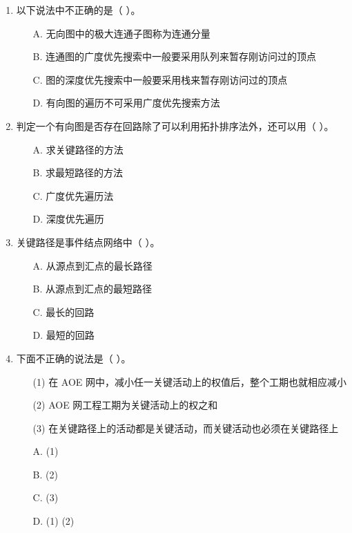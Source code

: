 \documentclass[12pt, a4paper]{article}
\begin{document}
\begin{enumerate}
    \item 以下说法中不正确的是（ ）。
    \begin{enumerate}
        \item[A.] 无向图中的极大连通子图称为连通分量
        \item[B.] 连通图的广度优先搜索中一般要采用队列来暂存刚访问过的顶点
        \item[C.] 图的深度优先搜索中一般要采用栈来暂存刚访问过的顶点
        \item[D.] 有向图的遍历不可采用广度优先搜索方法
    \end{enumerate}
    
    \item 判定一个有向图是否存在回路除了可以利用拓扑排序法外，还可以用（ ）。
    \begin{enumerate}
        \item[A.] 求关键路径的方法
        \item[B.] 求最短路径的方法
        \item[C.] 广度优先遍历法
        \item[D.] 深度优先遍历
    \end{enumerate}
    
    \item 关键路径是事件结点网络中（ ）。
    \begin{enumerate}
        \item[A.] 从源点到汇点的最长路径
        \item[B.] 从源点到汇点的最短路径
        \item[C.] 最长的回路
        \item[D.] 最短的回路
    \end{enumerate}
    
    \item 下面不正确的说法是（ ）。
    \begin{enumerate}
        \item[(1)] 在 AOE 网中，减小任一关键活动上的权值后，整个工期也就相应减小
        \item[(2)] AOE 网工程工期为关键活动上的权之和
        \item[(3)] 在关键路径上的活动都是关键活动，而关键活动也必须在关键路径上
        \item[A.] (1)
        \item[B.] (2)
        \item[C.] (3)
        \item[D.] (1) (2)
    \end{enumerate}
    

\end{enumerate}
\end{document}
